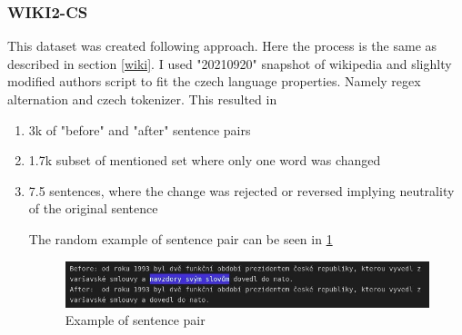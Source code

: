 \subsubsection{WIKI2-CS}
This dataset was created following \cite{pryzant2020automatically} approach. Here the process is the same as described in section \ref{wiki}. I used "20210920" snapshot of wikipedia and slighlty modified authors script to fit the czech language properties. Namely regex alternation and czech tokenizer. This resulted in
\begin{enumerate}
    \item 3k of "before" and "after" sentence pairs
    \item 1.7k subset of mentioned set where only one word was changed
    \item 7.5 sentences, where the change was rejected or reversed implying neutrality of the original sentence
    
The random example of sentence pair can be seen in \ref{fig:wiki2cs-example}

\newpage
\begin{figure}
  \includegraphics[width=\linewidth]{my_modules/multimedia/wiki2example.jpg}
  \caption{Example of sentence pair}
  \label{fig:wiki2cs-example}
\end{figure}

\end{enumerate}

